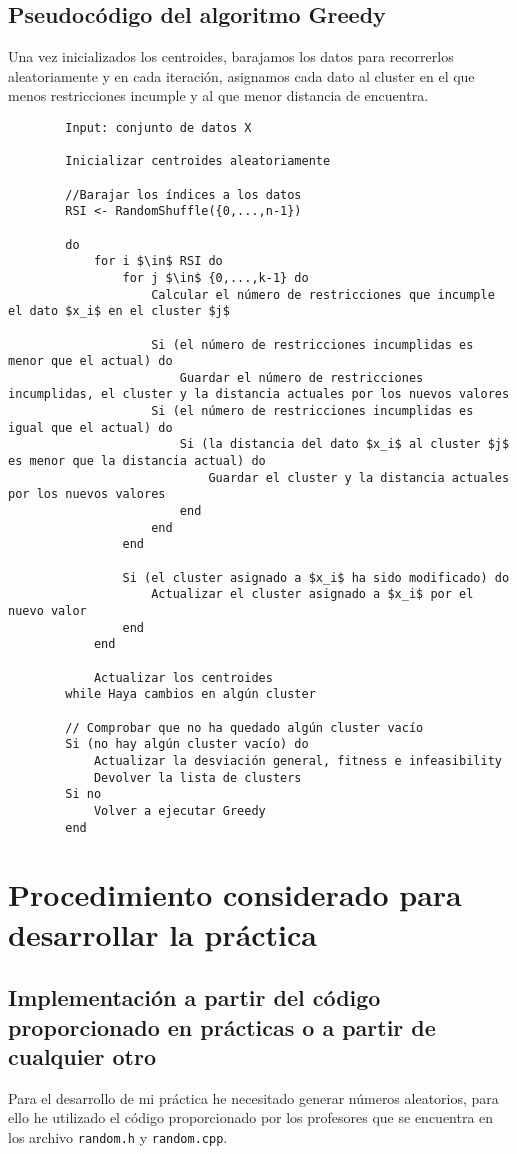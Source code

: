 		\subsection{Pseudocódigo del algoritmo Greedy}
		Una vez inicializados los centroides, barajamos los datos para recorrerlos aleatoriamente y en cada iteración, asignamos 
		cada dato al cluster en el que menos restricciones incumple y al que menor distancia de encuentra.

		\begin{lstlisting}
		Input: conjunto de datos X

		Inicializar centroides aleatoriamente
		
		//Barajar los índices a los datos 
		RSI <- RandomShuffle({0,...,n-1})

		do 
			for i $\in$ RSI do 
				for j $\in$ {0,...,k-1} do 
					Calcular el número de restricciones que incumple el dato $x_i$ en el cluster $j$

					Si (el número de restricciones incumplidas es menor que el actual) do
						Guardar el número de restricciones incumplidas, el cluster y la distancia actuales por los nuevos valores
					Si (el número de restricciones incumplidas es igual que el actual) do 
						Si (la distancia del dato $x_i$ al cluster $j$ es menor que la distancia actual) do 
							Guardar el cluster y la distancia actuales por los nuevos valores
						end
					end
				end 

				Si (el cluster asignado a $x_i$ ha sido modificado) do 
					Actualizar el cluster asignado a $x_i$ por el nuevo valor
				end
			end

			Actualizar los centroides
		while Haya cambios en algún cluster

		// Comprobar que no ha quedado algún cluster vacío
		Si (no hay algún cluster vacío) do 
			Actualizar la desviación general, fitness e infeasibility
			Devolver la lista de clusters
		Si no
			Volver a ejecutar Greedy 
		end
		\end{lstlisting}
\newpage

\section{Procedimiento considerado para desarrollar la práctica}
	\subsection{Implementación a partir del código proporcionado en prácticas o a partir de cualquier otro}
	Para el desarrollo de mi práctica he necesitado generar números aleatorios, para ello he utilizado el código 
	proporcionado por los profesores que se encuentra en los archivo \lstinline!random.h! y \lstinline!random.cpp!.
	
